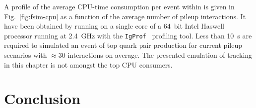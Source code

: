 A profile of the average CPU-time consumption per event within \FSIM is given in Fig.~\ref{fig:fsim-cpu} as a function of the average number of pileup interactions. It have been obtained by running \FSIM on a single core of a 64~bit Intel Haswell processor running at 2.4~GHz with the \texttt{IgProf}~\cite{Eulisse:865673} profiling tool. Less than 10~s are required to simulated an event of top quark pair production for current pileup scenarios with $\approx30$ interactions on average. The presented emulation of tracking in this chapter is not amongst the top CPU consumers.



\section{Conclusion}
\label{sec:fsim-conclusion}

